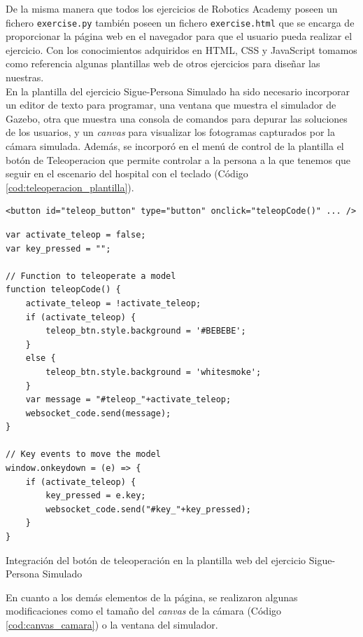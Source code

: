De la misma manera que todos los ejercicios de Robotics Academy poseen un fichero \texttt{exercise.py} también poseen un fichero \texttt{exercise.html} que se encarga de proporcionar la página web en el navegador para que el usuario pueda realizar el ejercicio. Con los conocimientos adquiridos en HTML, CSS y JavaScript tomamos como referencia algunas plantillas web de otros ejercicios para diseñar las nuestras.\\

En la plantilla del ejercicio Sigue-Persona Simulado ha sido necesario incorporar un editor de texto para programar, una ventana que muestra el simulador de Gazebo, otra que muestra una consola de comandos para depurar las soluciones de los usuarios, y un \textit{canvas} para visualizar los fotogramas capturados por la cámara simulada. Además, se incorporó en el menú de control de la plantilla el botón de Teleoperacion que permite controlar a la persona a la que tenemos que seguir en el escenario del hospital con el teclado (Código \ref{cod:teleoperacion_plantilla}).\\

\begin{code}[H]
\begin{lstlisting}
<button id="teleop_button" type="button" onclick="teleopCode()" ... />
\end{lstlisting}
\begin{lstlisting}
var activate_teleop = false;
var key_pressed = "";

// Function to teleoperate a model
function teleopCode() {
	activate_teleop = !activate_teleop;
	if (activate_teleop) {
		teleop_btn.style.background = '#BEBEBE';
	}
	else {
		teleop_btn.style.background = 'whitesmoke';
	}
	var message = "#teleop_"+activate_teleop;
	websocket_code.send(message);
}

// Key events to move the model
window.onkeydown = (e) => {
	if (activate_teleop) {
    	key_pressed = e.key;
		websocket_code.send("#key_"+key_pressed);
	}
}
\end{lstlisting}
\caption[Integración del botón de Teleoperación en la plantilla web del ejercicio Sigue-Persona Simulado]{Integración del botón de teleoperación en la plantilla web del ejercicio Sigue-Persona Simulado}
\label{cod:teleoperacion_plantilla}
\end{code}

En cuanto a los demás elementos de la página, se realizaron algunas modificaciones como el tamaño del \textit{canvas} de la cámara (Código \ref{cod:canvas_camara}) o la ventana del simulador.

